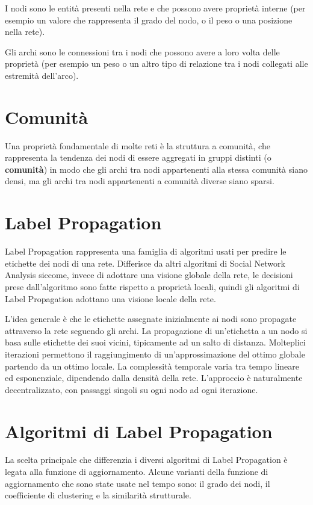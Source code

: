 \documentclass[a4paper,12pt]{report}
\begin{document}
	 I nodi sono le entità presenti nella rete e che possono avere proprietà interne (per esempio un valore che rappresenta il grado del nodo, o il peso o una posizione nella rete). 

	Gli archi sono le connessioni tra i nodi che possono avere a loro volta delle proprietà (per esempio un peso o un altro tipo di relazione tra i nodi collegati alle estremità dell'arco).	\cite{snaintro} 

	\section{Comunità}
	Una proprietà fondamentale di molte reti è la struttura a comunità, che rappresenta la tendenza dei nodi di essere aggregati in gruppi distinti (o \textbf{comunità}) in modo che gli archi tra nodi appartenenti alla stessa comunità siano densi, ma gli archi tra nodi appartenenti a comunità diverse siano sparsi. \cite{gregory}

	\section{Label Propagation}
	Label Propagation rappresenta una famiglia di algoritmi usati per predire le etichette dei nodi di una rete. 
	Differisce da altri algoritmi di Social Network Analysis siccome, invece di adottare una visione globale della rete, le decisioni prese dall'algoritmo sono fatte rispetto a proprietà locali, quindi gli algoritmi di Label Propagation adottano una visione locale della rete. \cite{raghavan} 

	L'idea generale è che le etichette assegnate inizialmente ai nodi sono propagate attraverso la rete seguendo gli archi. La propagazione di un'etichetta a un nodo si basa sulle etichette dei suoi vicini, tipicamente ad un salto di distanza. Molteplici iterazioni permettono il raggiungimento di un'approssimazione del ottimo globale partendo da un ottimo locale. La complessità temporale varia tra tempo lineare ed esponenziale, dipendendo dalla densità della rete. L'approccio è naturalmente decentralizzato, con passaggi singoli su ogni nodo ad ogni iterazione. \cite{avpra}
	
	\section{Algoritmi di Label Propagation}
	La scelta principale che differenzia i diversi algoritmi di Label Propagation è legata alla funzione di aggiornamento. Alcune varianti della funzione di aggiornamento che sono state usate nel tempo sono: il grado dei nodi, il coefficiente di clustering e la similarità strutturale.
\end{document}
